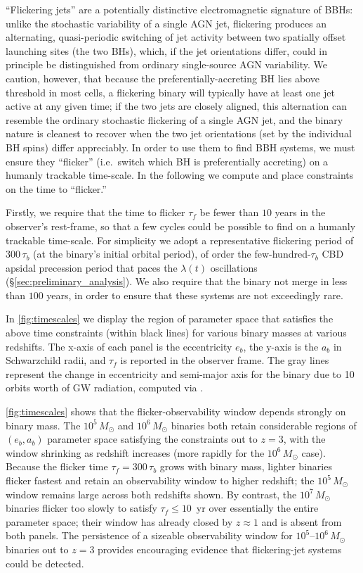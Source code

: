 \documentclass[fleqn,usenatbib]{mnras}
\begin{document}
``Flickering jets'' are a potentially distinctive electromagnetic signature of BBHs: unlike the stochastic variability of a single AGN jet, flickering produces an alternating, quasi-periodic switching of jet activity between two spatially offset launching sites (the two BHs), which, if the jet orientations differ, could in principle be distinguished from ordinary single-source AGN variability. We caution, however, that because the preferentially-accreting BH lies above threshold in most cells, a flickering binary will typically have at least one jet active at any given time; if the two jets are closely aligned, this alternation can resemble the ordinary stochastic flickering of a single AGN jet, and the binary nature is cleanest to recover when the two jet orientations (set by the individual BH spins) differ appreciably. In order to use them to find BBH systems, we must ensure they ``flicker'' (i.e.\ switch which BH is preferentially accreting) on a humanly trackable time-scale. In the following we compute  and place constraints on the time to ``flicker.''

Firstly, we require that the time to flicker $\tau_f$ be fewer than $10$ years in the observer's rest-frame, so that a few cycles could be possible to find on a humanly trackable time-scale. For simplicity we adopt a representative flickering period of $300\,\tau_b$ (at the binary's initial orbital period), of order the few-hundred-$\tau_b$ CBD apsidal precession period that paces the $\lambda(t)$ oscillations (\S\ref{sec:preliminary_analysis}). We also require that the binary not merge in less than $100$ years, in order to ensure that these systems are not exceedingly rare.

In \autoref{fig:timescales} we display the region of parameter space that satisfies the above time constraints (within black lines) for various binary masses at various redshifts. The x-axis of each panel is the eccentricity $e_b$, the y-axis is the $a_b$ in Schwarzchild radii, and $\tau_f$ is reported in the observer frame. The gray lines represent the change in eccentricity and semi-major axis for the binary due to 10 orbits worth of GW radiation, computed via \citet{peters_64}.

\autoref{fig:timescales} shows that the flicker-observability window depends strongly on binary mass. The $10^5\,M_\odot$ and $10^6\,M_\odot$ binaries both retain considerable regions of $(e_b, a_b)$ parameter space satisfying the constraints out to $z = 3$, with the window shrinking as redshift increases (more rapidly for the $10^6\,M_\odot$ case). Because the flicker time $\tau_f = 300\,\tau_b$ grows with binary mass, lighter binaries flicker fastest and retain an observability window to higher redshift; the $10^5\,M_\odot$ window remains large across both redshifts shown. By contrast, the $10^7\,M_\odot$ binaries flicker too slowly to satisfy $\tau_f \le 10$~yr over essentially the entire parameter space; their window has already closed by $z \approx 1$ and is absent from both panels. The persistence of a sizeable observability window for $10^5$--$10^6\,M_\odot$ binaries out to $z = 3$ provides encouraging evidence that flickering-jet systems could be detected.
\end{document}
